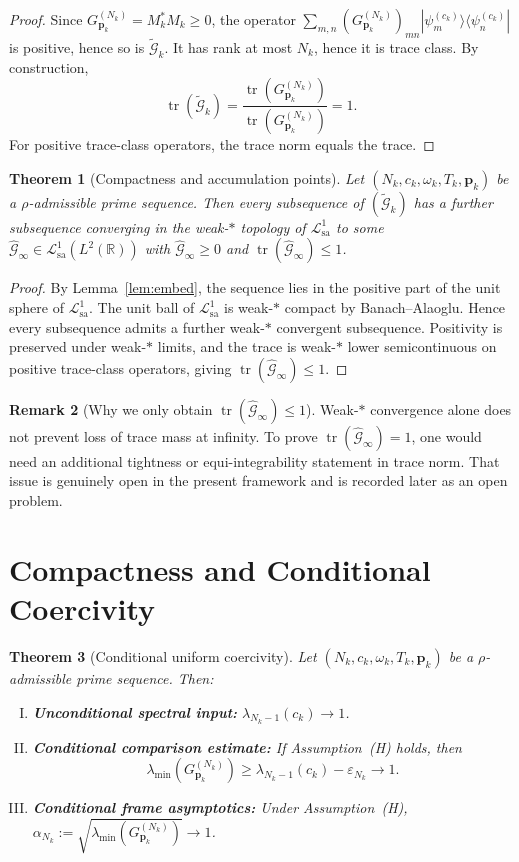 \documentclass[12pt,a4paper]{amsart}
\newtheorem{theorem}{Theorem}[section]
\theoremstyle{definition}
\newtheorem{remark}[theorem]{Remark}
\newcommand{\GVMk}{G^{(N_k)}_{\mathbf{p}_k}}
\newcommand{\Lcal}{\mathcal{L}^1_{\mathrm{sa}}}
\newcommand{\Gcal}{\widehat{\mathcal{G}}}
\begin{document}
\begin{proof}
Since $\GVMk=M_k^*M_k\ge0$, the operator
$\sum_{m,n}(\GVMk)_{mn}|\psi_m^{(c_k)}\rangle\langle\psi_n^{(c_k)}|$
is positive, hence so is $\widetilde{\mathcal G}_k$.
It has rank at most $N_k$, hence it is trace class.
By construction,
\[
  \operatorname{tr}(\widetilde{\mathcal G}_k)
  =\frac{\operatorname{tr}(\GVMk)}{\operatorname{tr}(\GVMk)}=1.
\]
For positive trace-class operators, the trace norm equals the trace.
\end{proof}

\begin{theorem}[Compactness and accumulation points]\label{thm:compact}
Let $(N_k,c_k,\omega_k,T_k,\mathbf p_k)$ be a $\rho$-admissible prime sequence.
Then every subsequence of $(\widetilde{\mathcal G}_k)$ has a further subsequence converging
in the weak-$*$ topology of $\Lcal$ to some
$\Gcal_\infty\in\Lcal(L^2(\mathbb R))$ with
$\Gcal_\infty\ge0$ and $\operatorname{tr}(\Gcal_\infty)\le1$.
\end{theorem}

\begin{proof}
By Lemma~\ref{lem:embed}, the sequence lies in the positive part of the unit sphere
of $\Lcal$.
The unit ball of $\Lcal$ is weak-$*$ compact by Banach--Alaoglu.
Hence every subsequence admits a further weak-$*$ convergent subsequence.
Positivity is preserved under weak-$*$ limits, and the trace is weak-$*$
lower semicontinuous on positive trace-class operators, giving
$\operatorname{tr}(\Gcal_\infty)\le1$.
\end{proof}

\begin{remark}[Why we only obtain $\operatorname{tr}(\Gcal_\infty)\le1$]
\label{rem:trace_eq}
Weak-$*$ convergence alone does not prevent loss of trace mass at infinity.
To prove $\operatorname{tr}(\Gcal_\infty)=1$, one would need an additional tightness or
equi-integrability statement in trace norm.
That issue is genuinely open in the present framework and is recorded later as an open problem.
\end{remark}

\section{Compactness and Conditional Coercivity}\label{sec:coercivity}

\begin{theorem}[Conditional uniform coercivity]\label{thm:coercivity}
Let $(N_k,c_k,\omega_k,T_k,\mathbf p_k)$ be a $\rho$-admissible prime sequence.
Then:
\begin{enumerate}[(I)]
\item \textbf{Unconditional spectral input:}
$\lambda_{N_k-1}(c_k)\to1$.
\item \textbf{Conditional comparison estimate:}
If Assumption~\textup{(H)} holds, then
\[
  \lambda_{\min}(\GVMk)
  \ge \lambda_{N_k-1}(c_k)-\varepsilon_{N_k}
  \to1.
\]
\item \textbf{Conditional frame asymptotics:}
Under Assumption~\textup{(H)},
$\alpha_{N_k}:=\sqrt{\lambda_{\min}(\GVMk)}\to1$.
\end{enumerate}
\end{theorem}
\end{document}
